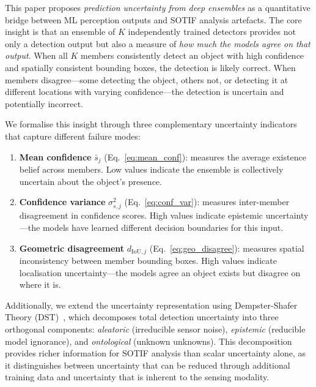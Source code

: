 \documentclass[conference]{IEEEtran}
\begin{document}
This paper proposes \emph{prediction uncertainty from deep ensembles} as a quantitative bridge between ML perception outputs and SOTIF analysis artefacts. The core insight is that an ensemble of $K$ independently trained detectors provides not only a detection output but also a measure of \emph{how much the models agree on that output}. When all $K$ members consistently detect an object with high confidence and spatially consistent bounding boxes, the detection is likely correct. When members disagree---some detecting the object, others not, or detecting it at different locations with varying confidence---the detection is uncertain and potentially incorrect.

We formalise this insight through three complementary uncertainty indicators that capture different failure modes:
\begin{enumerate}
    \item \textbf{Mean confidence} $\bar{s}_j$ (Eq.~\ref{eq:mean_conf}): measures the average existence belief across members. Low values indicate the ensemble is collectively uncertain about the object's presence.
    \item \textbf{Confidence variance} $\sigma^2_{s,j}$ (Eq.~\ref{eq:conf_var}): measures inter-member disagreement in confidence scores. High values indicate epistemic uncertainty---the models have learned different decision boundaries for this input.
    \item \textbf{Geometric disagreement} $d_{\text{IoU},j}$ (Eq.~\ref{eq:geo_disagree}): measures spatial inconsistency between member bounding boxes. High values indicate localisation uncertainty---the models agree an object exists but disagree on where it is.
\end{enumerate}

Additionally, we extend the uncertainty representation using Dempster-Shafer Theory (DST)~\cite{shafer1976,dempster1967}, which decomposes total detection uncertainty into three orthogonal components: \emph{aleatoric} (irreducible sensor noise), \emph{epistemic} (reducible model ignorance), and \emph{ontological} (unknown unknowns). This decomposition provides richer information for SOTIF analysis than scalar uncertainty alone, as it distinguishes between uncertainty that can be reduced through additional training data and uncertainty that is inherent to the sensing modality.
\end{document}
